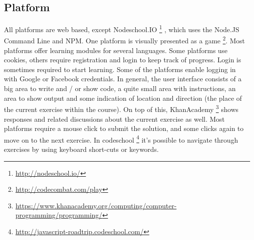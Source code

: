 \documentclass{article}
\begin{document}
\subsection{Platform}
All platforms are web based, except Nodeschool.IO
\footnote{\url{http://nodeschool.io/}}
, which uses the Node.JS 
Command Line and NPM. One platform is visually presented as a game
\footnote{\url{http://codecombat.com/play}}. Most platforms offer learning
modules for several languages. Some platforms use cookies, 
others require registration and login to keep track of progress. Login is 
sometimes required to start learning. Some of the platforms enable logging in 
with Google or Facebook credentials. \newline
In general, the user interface consists of a big area to write and / or show 
code, a quite small area with instructions, an area to show output and some 
indication of location and direction (the place of the current exercise within 
the course). On top of this, KhanAcademy
\footnote{
\url{https://www.khanacademy.org/computing/computer-programming/programming/}} 
shows responses and related discussions about the current exercise as
well. Most platforms require a mouse click to submit the solution, and some
clicks again to
move on to the next exercise. In codeschool
\footnote{\url{http://javascript-roadtrip.codeschool.com/}} 
it's possible to navigate through exercises by using keyboard short-cuts or 
keywords.
\end{document}
